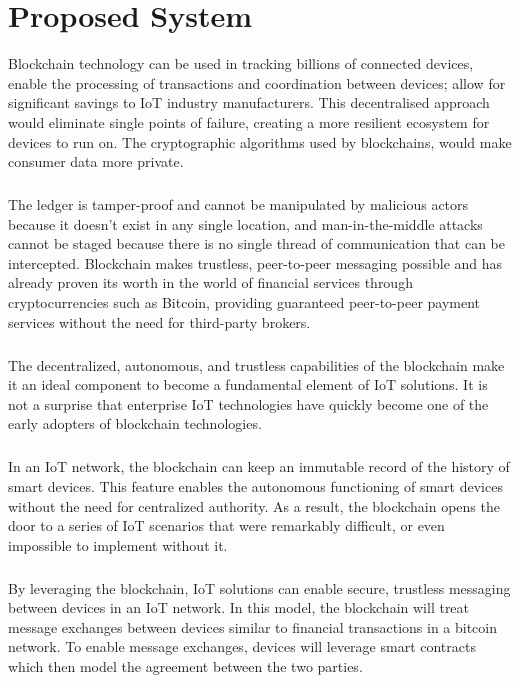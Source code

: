 \chapter{Proposed System}
Blockchain technology can be used in tracking billions of connected devices, enable the processing of transactions and coordination between devices; allow for significant savings to IoT industry manufacturers. This decentralised approach would eliminate single points of failure, creating a more resilient ecosystem for devices to run on. The cryptographic algorithms used by blockchains, would make consumer data more private.

\paragraph{}The ledger is tamper-proof and cannot be manipulated by malicious actors because it doesn’t exist in any single location, and man-in-the-middle attacks cannot be staged because there is no single thread of communication that can be intercepted. Blockchain makes trustless, peer-to-peer messaging possible and has already proven its worth in the world of financial services through cryptocurrencies such as Bitcoin, providing guaranteed peer-to-peer payment services without the need for third-party brokers.

\paragraph{}The decentralized, autonomous, and trustless capabilities of the blockchain make it an ideal component to become a fundamental element of IoT solutions. It is not a surprise that enterprise IoT technologies have quickly become one of the early adopters of blockchain technologies.

\paragraph{}In an IoT network, the blockchain can keep an immutable record of the history of smart devices. This feature enables the autonomous functioning of smart devices without the need for centralized authority. As a result, the blockchain opens the door to a series of IoT scenarios that were remarkably difficult, or even impossible to implement without it.

\paragraph{}By leveraging the blockchain, IoT solutions can enable secure, trustless messaging between devices in an IoT network. In this model, the blockchain will treat message exchanges between devices similar to financial transactions in a bitcoin network. To enable message exchanges, devices will leverage smart contracts which then model the agreement between the two parties.

